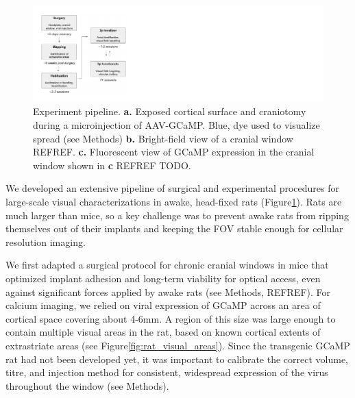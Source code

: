 \begin{figure}
    \includegraphics[width=\textwidth]{figures/chapter_2/fig_2-2_experiment_pipeline/experiment_pipeline.pdf}
    \vspace{.1in}
    \caption[Experiment pipeline]{Experiment pipeline. \textbf{a.} Exposed cortical surface and craniotomy during a microinjection of AAV-GCaMP. Blue, dye used to visualize spread (see Methods) \textbf{b.} Bright-field view of a cranial window REFREF. \textbf{c.} Fluorescent view of GCaMP expression in the cranial window shown in \textbf{c} REFREF TODO.
    \label{fig:experiment_pipeline}}
\end{figure}

We developed an extensive pipeline of surgical and experimental procedures for large-scale visual characterizations in awake, head-fixed rats (Figure\ref{fig:experiment_pipeline}). Rats are much larger than mice, so a key challenge was to prevent awake rats from ripping themselves out of their implants and keeping the FOV stable enough for cellular resolution imaging. 


We first adapted a surgical protocol for chronic cranial windows in mice \cite{Goldey2014} that optimized implant adhesion and long-term viability for optical access, even against significant forces applied by awake rats (see Methods, REFREF). For calcium imaging, we relied on viral expression of GCaMP across an area of cortical space covering about 4-6mm. A region of this size was large enough to contain multiple visual areas in the rat, based on known cortical extents of extrastriate areas (see Figure\ref{fig:rat_visual_areas}). Since the transgenic GCaMP rat \cite{Scott2018ImagingMacroscope} had not been developed yet, it was important to calibrate the correct volume, titre, and injection method for consistent, widespread expression of the virus throughout the window (see Methods). 

